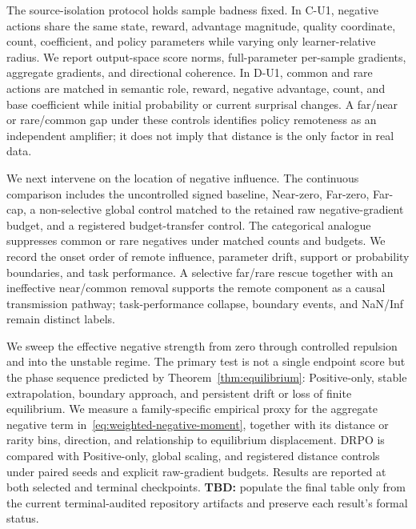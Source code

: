 The source-isolation protocol holds sample badness fixed. In C-U1, negative actions share the same state, reward, advantage magnitude, quality coordinate, count, coefficient, and policy parameters while varying only learner-relative radius. We report output-space score norms, full-parameter per-sample gradients, aggregate gradients, and directional coherence. In D-U1, common and rare actions are matched in semantic role, reward, negative advantage, count, and base coefficient while initial probability or current surprisal changes. A far/near or rare/common gap under these controls identifies policy remoteness as an independent amplifier; it does not imply that distance is the only factor in real data.


We next intervene on the location of negative influence. The continuous comparison includes the uncontrolled signed baseline, Near-zero, Far-zero, Far-cap, a non-selective global control matched to the retained raw negative-gradient budget, and a registered budget-transfer control. The categorical analogue suppresses common or rare negatives under matched counts and budgets. We record the onset order of remote influence, parameter drift, support or probability boundaries, and task performance. A selective far/rare rescue together with an ineffective near/common removal supports the remote component as a causal transmission pathway; task-performance collapse, boundary events, and NaN/Inf remain distinct labels.


We sweep the effective negative strength from zero through controlled repulsion and into the unstable regime. The primary test is not a single endpoint score but the phase sequence predicted by Theorem~\ref{thm:equilibrium}: Positive-only, stable extrapolation, boundary approach, and persistent drift or loss of finite equilibrium. We measure a family-specific empirical proxy for the aggregate negative term in~\eqref{eq:weighted-negative-moment}, together with its distance or rarity bins, direction, and relationship to equilibrium displacement. DRPO is compared with Positive-only, global scaling, and registered distance controls under paired seeds and explicit raw-gradient budgets. Results are reported at both selected and terminal checkpoints. \textbf{TBD:} populate the final table only from the current terminal-audited repository artifacts and preserve each result's formal status.

